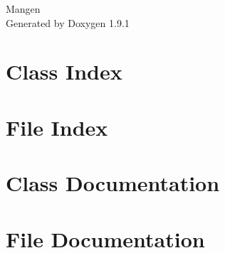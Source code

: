 \let\mypdfximage\pdfximage\def\pdfximage{\immediate\mypdfximage}\documentclass[twoside]{book}
\newcommand{\+}{\discretionary{\mbox{\scriptsize$\hookleftarrow$}}{}{}}
\newcommand{\clearemptydoublepage}{%
  \newpage{\pagestyle{empty}\cleardoublepage}%
}
\begin{document}
\raggedbottom

\hypersetup{pageanchor=false,
             bookmarksnumbered=true,
             pdfencoding=unicode
            }
\begin{titlepage}
\vspace*{7cm}
\begin{center}%
{\Large Mangen }\\
\vspace*{1cm}
{\large Generated by Doxygen 1.9.1}\\
\end{center}
\end{titlepage}
\clearemptydoublepage
{}
\tableofcontents
\clearemptydoublepage
{}
\hypersetup{pageanchor=true}

\chapter{Class Index}

\chapter{File Index}

\chapter{Class Documentation}


\chapter{File Documentation}








\backmatter
\newpage
{}
\clearemptydoublepage
{}
\printindex
\end{document}
